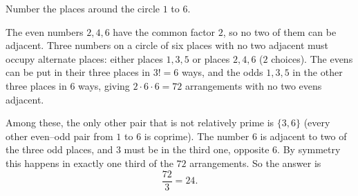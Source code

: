 Number the places around the circle $1$ to $6$.

The even numbers $2,4,6$ have the common factor $2$, so no two of them can be adjacent. Three numbers on a circle of six places with no two adjacent must occupy alternate places: either places $1,3,5$ or places $2,4,6$ ($2$ choices). The evens can be put in their three places in $3!=6$ ways, and the odds $1,3,5$ in the other three places in $6$ ways, giving $2\cdot6\cdot6=72$ arrangements with no two evens adjacent.

Among these, the only other pair that is not relatively prime is $\{3,6\}$ (every other even--odd pair from $1$ to $6$ is coprime). The number $6$ is adjacent to two of the three odd places, and $3$ must be in the third one, opposite $6$. By symmetry this happens in exactly one third of the $72$ arrangements. So the answer is
\[\dfrac{72}{3}=\boxed{24}.\]
